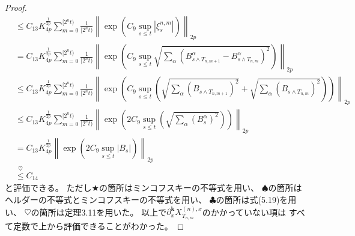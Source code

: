 \documentclass[uplatex]{jsarticle}
\theoremstyle{definition}
\begin{document}
\begin{proof}
\begin{align*}
    &\leq
    C_{13} K_{4p}^{\frac{1}{2p}} \sum_{m=0}^{[2^nt)} \frac{1}{[2^nt)}
    \left\| \exp\left( C_9 \sup_{s\leq t} |\xi_s^{n,m}| \right)\right\|_{2p} \\
    &=
    C_{13} K_{4p}^{\frac{1}{2p}} \sum_{m=0}^{[2^nt)} \frac{1}{[2^nt)}
    \left\| \exp\left( C_9 \sup_{s\leq t} \sqrt{ \sum_{\alpha}
    (B_{s\wedge T_{n,m+1}}^\alpha - B_{s\wedge T_{n,m}}^\alpha )^2 } \right)\right\|_{2p} \\
    &\leq
    C_{13} K_{4p}^{\frac{1}{2p}} \sum_{m=0}^{[2^nt)} \frac{1}{[2^nt)}
    \left\| \exp\left( C_9 \sup_{s\leq t} \left(
    \sqrt{ \sum_{\alpha} (B_{s\wedge T_{n,m+1}})^2}
    + \sqrt{ \sum_{\alpha} (B_{s\wedge T_{n,m}})^2}
    \right) \right)\right\|_{2p} \\
    &\leq
    C_{13} K_{4p}^{\frac{1}{2p}} \sum_{m=0}^{[2^nt)} \frac{1}{[2^nt)}
    \left\| \exp\left( 2C_9 \sup_{s\leq t} \left(
    \sqrt{ \sum_{\alpha} (B_s^{\alpha})^2}
    \right) \right)\right\|_{2p} \\
    &=
    C_{13} K_{4p}^{\frac{1}{2p}}
    \left\| \exp\left( 2C_9 \sup_{s\leq t} |B_s| \right)\right\|_{2p} \\
    &\overset{\heartsuit}{\leq} C_{14}
  \end{align*}
  と評価できる。
  ただし\(\bigstar\)の箇所はミンコフスキーの不等式を用い、
  \(\spadesuit\)の箇所はヘルダーの不等式とミンコフスキーの不等式を用い、
  \(\clubsuit\)の箇所は式(5.19)を用い、
  \(\heartsuit\)の箇所は定理3.11を用いた。
  以上で\(\partial_x^{\mathbf{k}}X_{T_{n,m}}^{(n),x}\)のかかっていない項は
  すべて定数で上から評価できることがわかった。


\end{proof}
\end{document}
